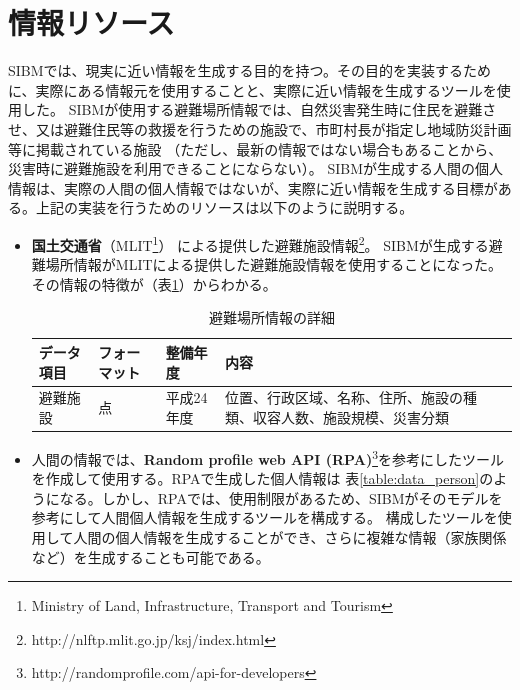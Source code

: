 \section{情報リソース}
\label{sibm:resource}

SIBMでは、現実に近い情報を生成する目的を持つ。その目的を実装するために、実際にある情報元を使用することと、実際に近い情報を生成するツールを使用した。
SIBMが使用する避難場所情報では、自然災害発生時に住民を避難させ、又は避難住民等の救援を行うための施設で、市町村長が指定し地域防災計画等に掲載されている施設
（ただし、最新の情報ではない場合もあることから、災害時に避難施設を利用できることにならない）。
SIBMが生成する人間の個人情報は、実際の人間の個人情報ではないが、実際に近い情報を生成する目標がある。上記の実装を行うためのリソースは以下のように説明する。

\begin{itemize}
	\item
	\textbf{国土交通省}（MLIT\footnote{Ministry of Land, Infrastructure, Transport and
	Tourism}） による提供した避難施設情報\footnote{http://nlftp.mlit.go.jp/ksj/index.html}。
	SIBMが生成する避難場所情報がMLITによる提供した避難施設情報を使用することになった。その情報の特徴が（表\ref{table:data_shelter}）からわかる。
	
	\begin{table}[h]
	\begin{center}
	\begin{tabular}{| l | l | l | p{48mm} |}
		\hline
		\rowstyle{\bfseries}
		データ項目 & フォーマット & 整備年度 & 内容 \\
		\hline
		避難施設 & 点 & 平成24年度 & 位置、行政区域、名称、住所、施設の種類、収容人数、施設規模、災害分類 \\
		\hline
	\end{tabular}
	\caption{避難場所情報の詳細}
	\label{table:data_shelter}
	\end{center}
	\end{table}

	\item 人間の情報では、\textbf{Random profile web
	API
	(RPA)}\footnote{http://randomprofile.com/api-for-developers}を参考にしたツールを作成して使用する。RPAで生成した個人情報は
	表\ref{table:data_person}のようになる。しかし、RPAでは、使用制限があるため、SIBMがそのモデルを参考にして人間個人情報を生成するツールを構成する。
	構成したツールを使用して人間の個人情報を生成することができ、さらに複雑な情報（家族関係など）を生成することも可能である。
	

\end{itemize}
